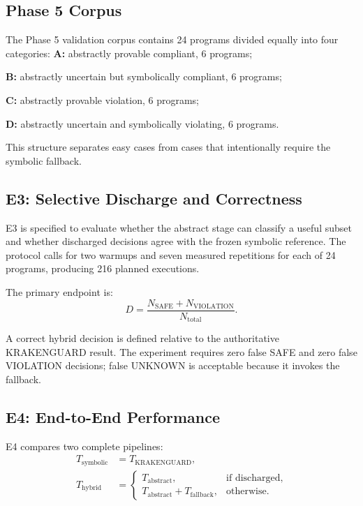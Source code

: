 \documentclass[12pt,a4paper]{article}
\begin{document}
\subsection{Phase 5 Corpus}

The Phase 5 validation corpus contains 24 programs divided equally into four categories:
\noindent \textbf{A:} abstractly provable compliant, 6 programs;

\noindent \textbf{B:} abstractly uncertain but symbolically compliant, 6 programs;

\noindent \textbf{C:} abstractly provable violation, 6 programs;

\noindent \textbf{D:} abstractly uncertain and symbolically violating, 6 programs.

This structure separates easy cases from cases that intentionally require the symbolic fallback.

\subsection{E3: Selective Discharge and Correctness}

E3 is specified to evaluate whether the abstract stage can classify a useful subset and whether discharged decisions agree with the frozen symbolic reference. The protocol calls for two warmups and seven measured repetitions for each of 24 programs, producing 216 planned executions.

The primary endpoint is:
\[
D=\frac{N_{\mathrm{SAFE}}+N_{\mathrm{VIOLATION}}}{N_{\mathrm{total}}}.
\]

A correct hybrid decision is defined relative to the authoritative KRAKENGUARD result. The experiment requires zero false SAFE and zero false VIOLATION decisions; false UNKNOWN is acceptable because it invokes the fallback.

\subsection{E4: End-to-End Performance}

E4 compares two complete pipelines:
\begin{align}
T_{\mathrm{symbolic}} &= T_{\mathrm{KRAKENGUARD}},\\
T_{\mathrm{hybrid}} &=
\begin{cases}
T_{\mathrm{abstract}}, & \text{if discharged},\\
T_{\mathrm{abstract}}+T_{\mathrm{fallback}}, & \text{otherwise}.
\end{cases}
\end{align}
\end{document}
